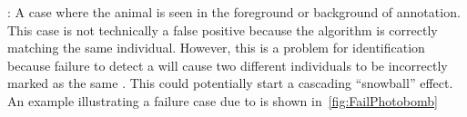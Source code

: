 \begin{itemln}
                \FailQuality{}





            \item \Photobomb{}:
            A case where the \groundtrue{} animal is seen in the foreground or background of \aan{\groundfalse{}}
              annotation.
            This case is not technically a false positive because the algorithm is correctly matching the same
              individual.
            However, this is a problem for identification because failure to detect a \photobomb{} will cause two
              different individuals to be incorrectly marked as the same \name{}.
            This could potentially start a cascading ``snowball'' effect.
            An example illustrating a failure case due to \photobombing{} is shown in~\cref{fig:FailPhotobomb}

              \FailPhotobomb{}
        \end{itemln}


